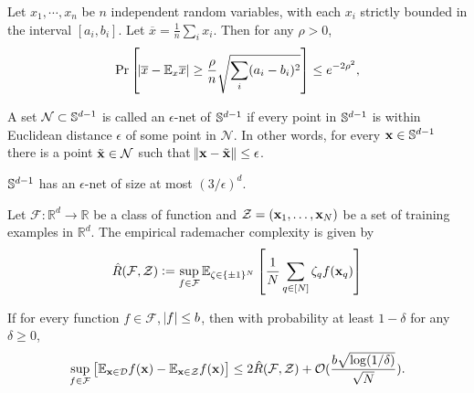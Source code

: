 \begin{fact}\label{fact:hoeffding}
	Let $x_1, \cdots, x_n$ be $n$ independent random variables, with each $x_i$ strictly bounded in the interval $[a_i, b_i]$. Let $\overline{x} = \frac{1}{n} \sum_i x_i$. Then for any $\rho > 0$,
	\begin{align*}
		\Pr\left[ \abs{\overline{x} - \mathbb{E}_x \overline{x}} \ge \frac{\rho}{n} \sqrt{\sum_i (a_i - b_i)^2}\right] \le e^{-2\rho^2},
	\end{align*}
\end{fact}


\begin{definition} A set $\mathcal{N} \subset \mathbb{S}^{d-1}$ is called an $\epsilon$-net of $\mathbb{S}^{d-1}$ if every point in 
	$\mathbb{S}^{d-1}$ is within Euclidean distance $\epsilon$ of some point in $\mathcal{N}$. In other words, for every $\mathbf{x} \in \mathbb{S}^{d-1}$ there is a point 
	$\tilde{\mathbf{x}} \in \mathcal{N}$ such that $\norm{\mathbf{x} - \tilde{\mathbf{x}}} \leq \epsilon$.
\end{definition}


\begin{fact}\label{fact:eps-net}
	$\mathbb{S}^{d-1}$ has an $\epsilon$-net of size at most $(3/\epsilon)^d$. 
\end{fact}

Let $\mathcal{F}:\mathbb{R}^{d} \to \mathbb{R}$ be a class of function and $\mathcal{Z} = (\mathbf{x}_1, \ldots, \mathbf{x}_N)$ be a set of training examples in $\mathbb{R}^{d}$. The empirical rademacher complexity is given by
\begin{align*}
	\hat{R}(\mathcal{F}, \mathcal{Z}) := \sup_{f \in \mathcal{F}} \mathbb{E}_{\zeta \in \{\pm 1\}^N} \left[\frac{1}{N} \sum_{q \in [N]} \zeta_q f(\mathbf{x}_q) \right]
\end{align*}

\begin{fact}\label{fact:genRad}
	If for every function $f \in \mathcal{F}$, $\abs{f} \le b$, then with probability at least $1 - \delta$ for any $\delta \ge 0$,
	\begin{align*}
		\sup_{f \in \mathcal{F}} \left[\mathbb{E}_{\mathbf{x} \in \mathcal{D}} f(\mathbf{x}) - \mathbb{E}_{\mathbf{x} \in \mathcal{Z}} f(\mathbf{x}) \right] \le 2 \hat{R}(\mathcal{F}, \mathcal{Z})  + \mathcal{O}(\frac{b \sqrt{\log (1/\delta)}}{\sqrt{N}}).
	\end{align*}
\end{fact}

